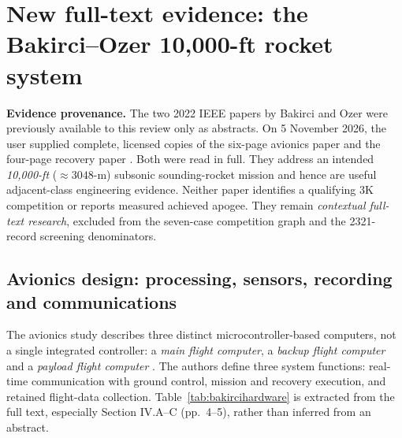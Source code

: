 \documentclass[10pt,a4paper]{article}
\begin{document}
\section{New full-text evidence: the Bakirci--Ozer 10,000-ft rocket system}
\label{sec:bakircifulltext}
\textbf{Evidence provenance.} The two 2022 IEEE papers by Bakirci and Ozer were previously available to this review only as abstracts. On 5 November 2026, the user supplied complete, licensed copies of the six-page avionics paper \cite{bakirci2022} and the four-page recovery paper \cite{bakirci2022recovery}. Both were read in full. They address an intended \emph{10,000-ft} ($\approx3048$-m) subsonic sounding-rocket mission and hence are useful adjacent-class engineering evidence. Neither paper identifies a qualifying 3K competition or reports measured achieved apogee. They remain \emph{contextual full-text research}, excluded from the seven-case competition graph and the 2321-record screening denominators.

\subsection{Avionics design: processing, sensors, recording and communications}
The avionics study describes three distinct microcontroller-based computers, not a single integrated controller: a \emph{main flight computer}, a \emph{backup flight computer} and a \emph{payload flight computer} \cite{bakirci2022}. The authors define three system functions: real-time communication with ground control, mission and recovery execution, and retained flight-data collection. Table~\ref{tab:bakircihardware} is extracted from the full text, especially Section IV.A--C (pp.~4--5), rather than inferred from an abstract.
\end{document}
